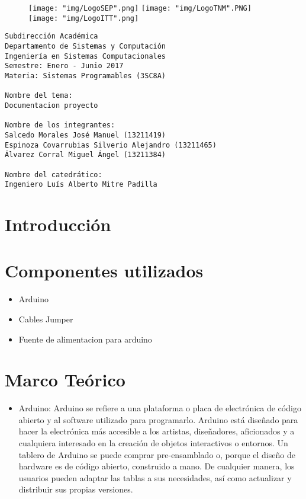 \documentclass{article}
\begin{document}
\begin{figure}[!htb]
	\texttt{[image: "img/LogoSEP".png]}
\endminipage\hfill
{}
	\texttt{[image: "img/LogoTNM".PNG]}
\endminipage\hfill
{}
	\texttt{[image: "img/LogoITT".png]}
\endminipage\hfill
\end{figure}

\begingroup
\LARGE
\begin{verbatim}
Subdirección Académica
Departamento de Sistemas y Computación
Ingeniería en Sistemas Computacionales
Semestre: Enero - Junio 2017
Materia: Sistemas Programables (3SC8A)

Nombre del tema:
Documentacion proyecto

Nombre de los integrantes:
Salcedo Morales José Manuel (13211419)
Espinoza Covarrubias Silverio Alejandro (13211465)
Álvarez Corral Miguel Ángel (13211384)

Nombre del catedrático:
Ingeniero Luís Alberto Mitre Padilla

\end{verbatim}
\endgroup

\newpage
\tableofcontents

\newpage
\section{Introducción}

\section{Componentes utilizados}
\begin{itemize}
        \item Arduino
        \item Cables Jumper
        \item Fuente de alimentacion para arduino
\end{itemize}

\newpage
\section{Marco Teórico}
\begin{itemize}
	\item Arduino: Arduino se refiere a una plataforma o placa de electrónica de código abierto y al software utilizado para programarlo. Arduino está diseñado para hacer la electrónica más accesible a los artistas, diseñadores, aficionados y a cualquiera interesado en la creación de objetos interactivos o entornos. Un tablero de Arduino se puede comprar pre-ensamblado o, porque el diseño de hardware es de código abierto, construido a mano. De cualquier manera, los usuarios pueden adaptar las tablas a sus necesidades, así como actualizar y distribuir sus propias versiones.
\end{itemize}
\end{document}
